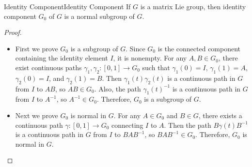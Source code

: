 \documentclass[../main.tex]{subfiles}
\begin{document}
\begin{proposition}{Identity Component}{Identity Component}
	If $G$ is a matrix Lie group, then identity component $G_0$ of $G$ is a normal subgroup of $G$.
\end{proposition}
\begin{proof}
	\begin{itemize}
		\item First we prove $G_0$ is a subgroup of $G$. Since $G_0$ is the connected component containing the identity element $I$, it is nonempty. For any $A,B \in G_0$, there exist continuous paths $\gamma_1, \gamma_2: [0,1] \to G_0$ such that $\gamma_1(0) = I$, $\gamma_1(1) = A$, $\gamma_2(0) = I$, and $\gamma_2(1) = B$. Then $\gamma_1(t) \gamma_2(t)$ is a continuous path in $G$ from $I$ to $AB$, so $AB \in G_0$. Also, the path $\gamma_1(t)^{-1}$ is a continuous path in $G$ from $I$ to $A^{-1}$, so $A^{-1} \in G_0$. Therefore, $G_0$ is a subgroup of $G$.
		\item Next we prove $G_0$ is normal in $G$. For any $A \in G_0$ and $B \in G$, there exists a continuous path $\gamma: [0,1] \to G_0$ connecting $I$ to $A$. Then the path $B \gamma(t) B^{-1}$ is a continuous path in $G$ from $I$ to $BAB^{-1}$, so $BAB^{-1} \in G_0$. Therefore, $G_0$ is normal in $G$.
	\end{itemize}
\end{proof}
\end{document}
